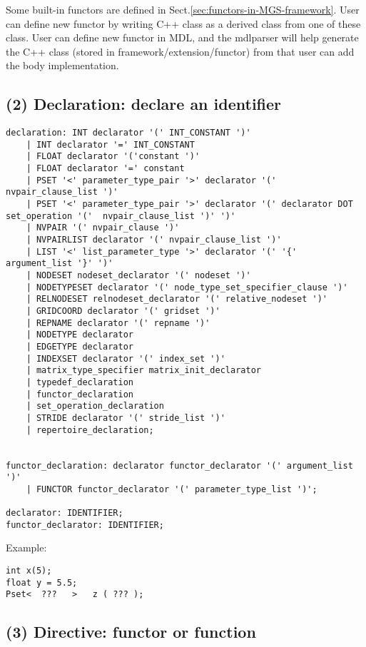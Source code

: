 Some built-in functors are defined in Sect.\ref{sec:functors-in-MGS-framework}. 
User can define new functor by writing C++ class as a derived class from one of
these class. User can define new functor in MDL, and the mdlparser will help
generate the C++ class (stored in framework/extension/functor) from that user
can add the body implementation.


\subsection{(2) Declaration: declare an identifier}
\label{sec:MGS-grammar-keywords}
\label{sec:gsl-declaration-section}

\begin{verbatim}
declaration: INT declarator '(' INT_CONSTANT ')'  
    | INT declarator '=' INT_CONSTANT         
    | FLOAT declarator '('constant ')'   
    | FLOAT declarator '=' constant
    | PSET '<' parameter_type_pair '>' declarator '(' nvpair_clause_list ')' 
    | PSET '<' parameter_type_pair '>' declarator '(' declarator DOT set_operation '('  nvpair_clause_list ')' ')'
    | NVPAIR '(' nvpair_clause ')'
	| NVPAIRLIST declarator '(' nvpair_clause_list ')'
    | LIST '<' list_parameter_type '>' declarator '(' '{' argument_list '}' ')'
    | NODESET nodeset_declarator '(' nodeset ')'
	| NODETYPESET declarator '(' node_type_set_specifier_clause ')'
    | RELNODESET relnodeset_declarator '(' relative_nodeset ')'
    | GRIDCOORD declarator '(' gridset ')'
    | REPNAME declarator '(' repname ')'
    | NODETYPE declarator
    | EDGETYPE declarator
    | INDEXSET declarator '(' index_set ')'
    | matrix_type_specifier matrix_init_declarator
    | typedef_declaration
    | functor_declaration
	| set_operation_declaration
    | STRIDE declarator '(' stride_list ')'
	| repertoire_declaration;


functor_declaration: declarator functor_declarator '(' argument_list ')'
	| FUNCTOR functor_declarator '(' parameter_type_list ')';

declarator: IDENTIFIER;
functor_declarator: IDENTIFIER;

\end{verbatim}

Example:
\begin{verbatim}
int x(5);
float y = 5.5;
Pset<  ???   >   z ( ??? );

\end{verbatim}


\subsection{(3) Directive: functor or function}
\label{sec:gsl-direftive-section}

